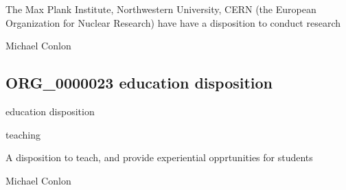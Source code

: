 \documentclass[letterpaper,10pt,english]{sphinxmanual}
\begin{document}
\begin{sphinxShadowBox}

\sphinxAtStartPar
The Max Plank Institute, Northwestern University, CERN (the European Organization for Nuclear Research) have have a disposition to conduct research
\end{sphinxShadowBox}

\begin{sphinxShadowBox}

\sphinxAtStartPar
Michael Conlon 
\end{sphinxShadowBox}
\begin{quote}

\ignorespaces \end{quote}


\subsection{ORG\_0000023 \sphinxhyphen{} education disposition}
\label{\detokenize{doc-ORG_0000023:org-0000023-education-disposition}}\label{\detokenize{doc-ORG_0000023:index-0}}\label{\detokenize{doc-ORG_0000023::doc}}
\begin{sphinxShadowBox}

\sphinxAtStartPar
education disposition
\end{sphinxShadowBox}

\begin{sphinxShadowBox}

\sphinxAtStartPar
teaching
\end{sphinxShadowBox}

\begin{sphinxShadowBox}

\sphinxAtStartPar
A disposition to teach, and provide experiential opprtunities for students
\end{sphinxShadowBox}

\begin{sphinxShadowBox}

\sphinxAtStartPar
Michael Conlon 
\end{sphinxShadowBox}
\end{document}
